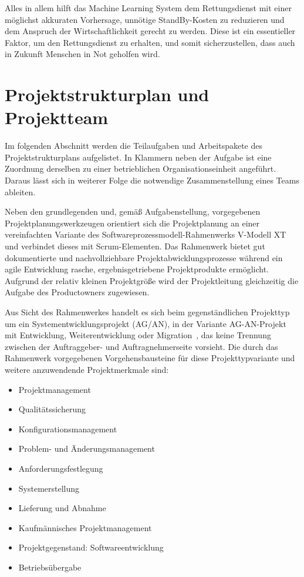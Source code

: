 Alles in allem hilft das Machine Learning System dem Rettungsdienst mit einer möglichst akkuraten Vorhersage, unnötige StandBy-Kosten zu reduzieren und dem Anspruch der Wirtschaftlichkeit gerecht zu werden. Diese ist ein essentieller Faktor, um den Rettungsdienst zu erhalten, und somit sicherzustellen, dass auch in Zukunft Menschen in Not geholfen wird.


\chapter{Projektstrukturplan und Projektteam}

Im folgenden Abschnitt werden die Teilaufgaben und Arbeitspakete des Projektstrukturplans \citep{wikipedia_projektstrukturplan_2022} aufgelistet. In Klammern neben der Aufgabe ist eine Zuordnung derselben zu einer betrieblichen Organisationseinheit angeführt. Daraus lässt sich in weiterer Folge die notwendige Zusammenstellung eines Teams ableiten.  

Neben den grundlegenden und, gemäß Aufgabenstellung, vorgegebenen Projektplanungswerkzeugen orientiert sich die Projektplanung an einer vereinfachten Variante des Softwareprozessmodell-Rahmenwerks V-Modell XT und verbindet dieses mit Scrum-Elementen. Das Rahmenwerk bietet gut dokumentierte und nachvollziehbare Projektabwicklungsprozesse während ein agile Entwicklung rasche, ergebnisgetriebene Projektprodukte ermöglicht. Aufgrund der relativ kleinen Projektgröße wird der Projektleitung gleichzeitig die Aufgabe des Productowners zugewiesen. 

Aus Sicht des Rahmenwerkes handelt es sich beim gegenständlichen Projekttyp um ein Systementwicklungsprojekt (AG/AN), in der Variante \glqq AG-AN-Projekt mit Entwicklung, Weiterentwicklung oder Migration\grqq\ , das keine Trennung zwischen der Auftraggeber- und Auftragnehmerseite vorsieht. Die durch das Rahmenwerk vorgegebenen Vorgehensbausteine für diese Projekttypvariante und weitere anzuwendende Projektmerkmale sind:

\begin{itemize}
	 \itemsep-8pt
	 \item Projektmanagement
	 \item Qualitätssicherung
	 \item Konfigurationsmanagement
	 \item Problem- und Änderungsmanagement
	 \item Anforderungsfestlegung
	 \item Systemerstellung
	 \item Lieferung und Abnahme
	 \item Kaufmännisches Projektmanagement
	 \item Projektgegenstand: Softwareentwicklung
	 \item Betriebsübergabe
\end{itemize} 

